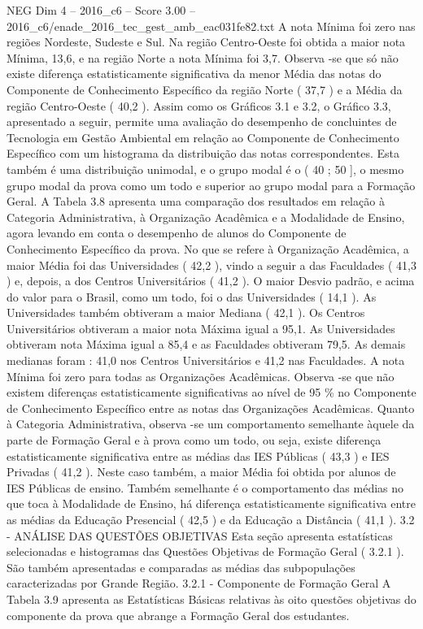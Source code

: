 \begin{textsample}{NEG Dim 4 – 2016\_c6 – Score 3.00 – 2016\_c6/enade\_2016\_tec\_gest\_amb\_eac031fe82.txt}
A nota Mínima foi zero nas regiões Nordeste, Sudeste e Sul.
Na região Centro-Oeste foi obtida a maior nota Mínima, 13,6, e na região Norte a nota Mínima foi 3,7.
Observa -se que só não existe diferença estatisticamente significativa da menor Média das notas do Componente de Conhecimento Específico da região Norte ( 37,7 ) e a Média da região Centro-Oeste ( 40,2 ).
Assim como os Gráficos 3.1 e 3.2, o Gráfico 3.3, apresentado a seguir, permite uma avaliação do desempenho de concluintes de Tecnologia em Gestão Ambiental em relação ao Componente de Conhecimento Específico com um histograma da distribuição das notas correspondentes.
Esta também é uma distribuição unimodal, e o grupo modal é o ( 40 ; 50 ], o mesmo grupo modal da prova como um todo e superior ao grupo modal para a Formação Geral.
A Tabela 3.8 apresenta uma comparação dos resultados em relação à Categoria Administrativa, à Organização Acadêmica e a Modalidade de Ensino, agora levando em conta o desempenho de alunos do Componente de Conhecimento Específico da prova.
No que se refere à Organização Acadêmica, a maior Média foi das Universidades ( 42,2 ), vindo a seguir a das Faculdades ( 41,3 ) e, depois, a dos Centros Universitários ( 41,2 ).
O maior Desvio padrão, e acima do valor para o Brasil, como um todo, foi o das Universidades ( 14,1 ).
As Universidades também obtiveram a maior Mediana ( 42,1 ).
Os Centros Universitários obtiveram a maior nota Máxima igual a 95,1.
As Universidades obtiveram nota Máxima igual a 85,4 e as Faculdades obtiveram 79,5.
As demais medianas foram : 41,0 nos Centros Universitários e 41,2 nas Faculdades.
A nota Mínima foi zero para todas as Organizações Acadêmicas.
Observa -se que não existem diferenças estatisticamente significativas ao nível de 95 \% no Componente de Conhecimento Específico entre as notas das Organizações Acadêmicas.
Quanto à Categoria Administrativa, observa -se um comportamento semelhante àquele da parte de Formação Geral e à prova como um todo, ou seja, existe diferença estatisticamente significativa entre as médias das IES Públicas ( 43,3 ) e IES Privadas ( 41,2 ).
Neste caso também, a maior Média foi obtida por alunos de IES Públicas de ensino.
Também semelhante é o comportamento das médias no que toca à Modalidade de Ensino, há diferença estatisticamente significativa entre as médias da Educação Presencial ( 42,5 ) e da Educação a Distância ( 41,1 ). 3.2 - ANÁLISE DAS QUESTÕES OBJETIVAS Esta seção apresenta estatísticas selecionadas e histogramas das Questões Objetivas de Formação Geral ( 3.2.1 ).
São também apresentadas e comparadas as médias das subpopulações caracterizadas por Grande Região. 3.2.1 - Componente de Formação Geral A Tabela 3.9 apresenta as Estatísticas Básicas relativas às oito questões objetivas do componente da prova que abrange a Formação Geral dos estudantes.

\end{textsample}
